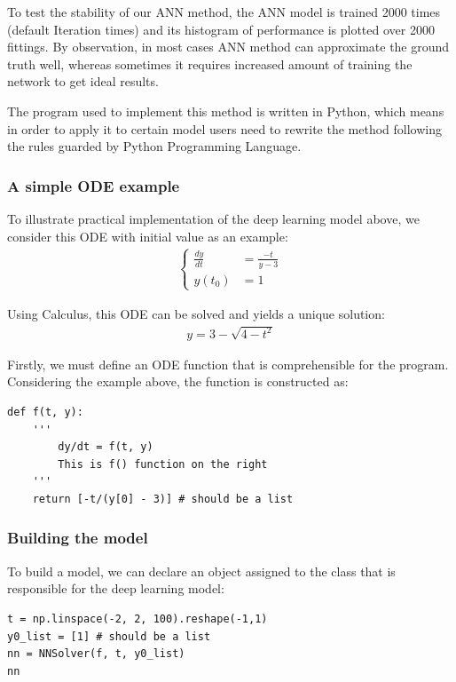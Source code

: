 \documentclass[a4paper]{article}
\numberwithin{equation}{section}
\begin{document}
To test the stability of our ANN method, the ANN model is trained 2000 times (default Iteration times) and its histogram of performance is plotted over 2000 fittings. By observation, in most cases ANN method can approximate the ground truth well, whereas sometimes it requires increased amount of training the network to get ideal results.

The program used to implement this method is written in Python, which means in order to apply it to certain model users need to rewrite the method following the rules guarded by Python Programming Language.

\subsubsection{A simple ODE example}
To illustrate practical implementation of the deep learning model above, we consider this ODE with initial value as an example:
\begin{align*}
  \begin{cases}
    \frac{dy}{dt} & = \frac{-t}{y - 3} \\
    y(t_0)        & = 1
  \end{cases}
\end{align*}

Using Calculus, this ODE can be solved and yields a unique solution:
\begin{align}
  \label{eq:SimODE}
  y = 3 - \sqrt{4-t^2}
\end{align}

Firstly, we must define an ODE function that is comprehensible for the program. Considering the example above, the function is constructed as:
\begin{mdframed}[leftline=false,rightline=false,backgroundcolor=magenta!10,nobreak=true]
  \begin{verbatim}
def f(t, y):
    '''
        dy/dt = f(t, y)
        This is f() function on the right
    '''
    return [-t/(y[0] - 3)] # should be a list
  \end{verbatim}
\end{mdframed}

\subsubsection{Building the model}
To build a model, we can declare an object assigned to the class that is responsible for the deep learning model:
\begin{mdframed}[leftline=false,rightline=false,backgroundcolor=magenta!10,nobreak=true]
  \begin{verbatim}
t = np.linspace(-2, 2, 100).reshape(-1,1)
y0_list = [1] # should be a list
nn = NNSolver(f, t, y0_list)
nn
  \end{verbatim}
\end{mdframed}
\end{document}
